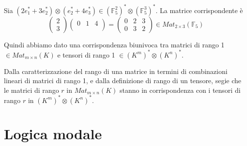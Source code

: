 \documentclass[10pt,a4paper,twoside]{book}
\begin{document}
\begin{example}
    Sia $(2 e_1^* + 3 e_2^*) \otimes (e_2^* + 4 e_3^*) \in (\mathbb{F}_5^2)^* \otimes (\mathbb{F}_5^3)^*$. La matrice corrispondente è
    \begin{equation*}
        \begin{pmatrix}
            2 \\
            3
        \end{pmatrix} \begin{pmatrix}
            0 & 1 & 4 \\
        \end{pmatrix} = \begin{pmatrix}
            0 & 2 & 3 \\
            0 & 3 & 2
        \end{pmatrix} \in Mat_{2 \times 3}(\mathbb{F}_5)
    \end{equation*}
\end{example}

Quindi abbiamo dato una corrispondenza biunivoca tra matrici di rango 1 $\in Mat_{m \times n}(K)$ e tensori di rango 1 $\in (K^m)^* \otimes (K^n)^*$.

Dalla caratterizzazione del rango di una matrice in termini di combinazioni lineari di matrici di rango 1, e dalla definizione di rango di un tensore, segie che le matrici di rango $r$ in $Mat_{m \times n}(K)$ stanno in corrispondenza con i tensori di rango $r$ in $(K^m)^* \otimes (K^n)^*$.

\newpage


\chapter{Logica modale}
\end{document}
